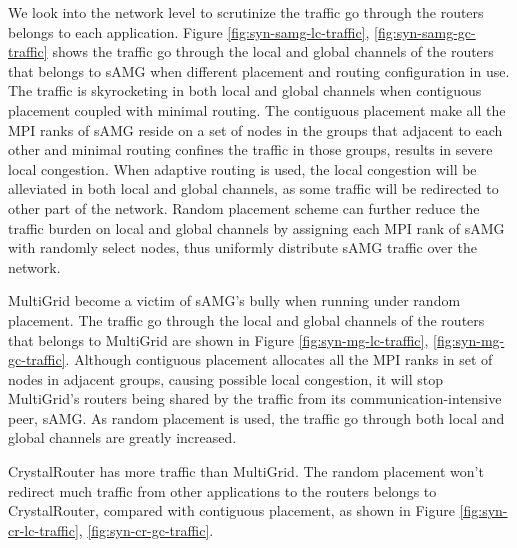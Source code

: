 \documentclass[conference,compsoc]{IEEEtran}
\begin{document}
We look into the network level to scrutinize the traffic go through the routers belongs to each application. 
Figure \ref{fig:syn-samg-lc-traffic}, \ref{fig:syn-samg-gc-traffic} shows the traffic go through the local and global channels of the routers that belongs to sAMG when different placement and routing configuration in use. The traffic is skyrocketing in both local and global channels when contiguous placement coupled with minimal routing. The contiguous placement make all the MPI ranks of sAMG reside on a set of nodes in the groups that adjacent to each other and minimal routing confines the traffic in those groups, results in severe local congestion. When adaptive routing is used, the local congestion will be alleviated in both local and global channels, as some traffic will be redirected to other part of the network. Random placement scheme can further reduce the traffic burden on local and global channels by assigning each MPI rank of sAMG with randomly select nodes, thus uniformly distribute sAMG traffic over the network. 

MultiGrid become a victim of sAMG's bully when running under random placement. The traffic go through the local and global channels of the routers that belongs to MultiGrid are shown in Figure \ref{fig:syn-mg-lc-traffic}, \ref{fig:syn-mg-gc-traffic}. Although contiguous placement allocates all the MPI ranks in set of nodes in adjacent groups, causing possible local congestion, it will stop MultiGrid's routers being shared by the traffic from its communication-intensive peer, sAMG. As random placement is used, the traffic go through both local and global channels are greatly increased. 

CrystalRouter has more traffic than MultiGrid. The random placement won't redirect much traffic from other applications to the routers belongs to CrystalRouter, compared with contiguous placement, as shown in Figure \ref{fig:syn-cr-lc-traffic}, \ref{fig:syn-cr-gc-traffic}.
\end{document}
